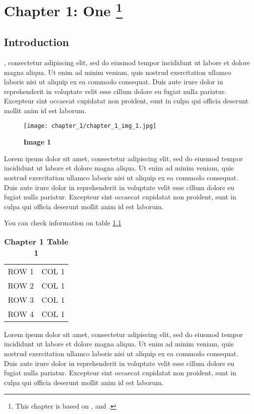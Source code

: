 \chapter[Chapter 1: One]{Chapter 1: One \footnote{This chapter is based on \cite{einstein}, \cite{latexcompanion} and \cite{knuthwebsite}.}}
\label{chap:chapter_1} 

\section{Introduction}

, consectetur adipiscing elit, sed do eiusmod tempor incididunt ut labore et dolore magna aliqua. Ut enim ad minim veniam, quis nostrud exercitation ullamco laboris nisi ut aliquip ex ea commodo consequat. Duis aute irure dolor in reprehenderit in voluptate velit esse cillum dolore eu fugiat nulla pariatur. Excepteur sint occaecat cupidatat non proident, sunt in culpa qui officia deserunt mollit anim id est laborum.

\begin{figure}[thpb]
    \centering
    \texttt{[image: chapter\_1/chapter\_1\_img\_1.jpg]}
    \caption[Image 1]{\bf{Image 1}}
    \label{fig:chapt_1_img_1}
\end{figure}

Lorem ipsum dolor sit amet, consectetur adipiscing elit, sed do eiusmod tempor incididunt ut labore et dolore magna aliqua. Ut enim ad minim veniam, quis nostrud exercitation ullamco laboris nisi ut aliquip ex ea commodo consequat. Duis aute irure dolor in reprehenderit in voluptate velit esse cillum dolore eu fugiat nulla pariatur. Excepteur sint occaecat cupidatat non proident, sunt in culpa qui officia deserunt mollit anim id est laborum.\newline

You can check information on table \ref{tab:chaper_1_table_1} 

\begin{table}[thpb]
\begin{center}
\begin{tabular}{l l}
ROW 1&COL 1\\
ROW 2&COL 1\\
ROW 3&COL 1\\
ROW 4&COL 1\\
\end{tabular}
\caption[Chapter 1 Table 1]{\bf{Chapter 1 Table 1}}
\label{tab:chaper_1_table_1}
\end{center}
\end{table}

Lorem ipsum dolor sit amet, consectetur adipiscing elit, sed do eiusmod tempor incididunt ut labore et dolore magna aliqua. Ut enim ad minim veniam, quis nostrud exercitation ullamco laboris nisi ut aliquip ex ea commodo consequat. Duis aute irure dolor in reprehenderit in voluptate velit esse cillum dolore eu fugiat nulla pariatur. Excepteur sint occaecat cupidatat non proident, sunt in culpa qui officia deserunt mollit anim id est laborum.

